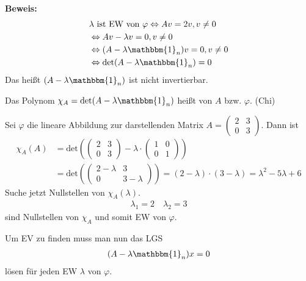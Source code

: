 \textbf{Beweis:}
\begin{align*}
	&\lambda\text{ ist EW von }\varphi \Leftrightarrow Av = 2v, v \neq 0 \\
	&\Leftrightarrow Av - \lambda v = 0, v \neq 0 \\
	&\Leftrightarrow (A - \lambda \mathbbm{1}_n)v = 0, v \neq 0 \\
	&\Leftrightarrow \text{det}(A - \lambda \mathbbm{1}_n) = 0
\end{align*}
Das heißt $(A - \lambda \mathbbm{1}_n)$ ist nicht invertierbar.

Das Polynom $\chi_A = \text{det}(A - \lambda \mathbbm{1}_n)$ heißt  von $A$ bzw. $\varphi$. (Chi)

Sei $\varphi$ die lineare Abbildung zur darstellenden Matrix $A = \begin{pmatrix}2 & 3 \\ 0 & 3\end{pmatrix}$. Dann ist
\begin{align*}
	\chi_A(A) &= \text{det}\left(\begin{pmatrix}2 & 3 \\ 0 & 3\end{pmatrix} - \lambda\cdot\begin{pmatrix}1 & 0 \\ 0 & 1\end{pmatrix}\right) \\
	&= \text{det}\left(\begin{pmatrix}2-\lambda & 3 \\ 0 & 3-\lambda\end{pmatrix}\right) = (2-\lambda)\cdot(3-\lambda) = \lambda^2 - 5\lambda + 6
\end{align*}
Suche jetzt Nullstellen von $\chi_A(\lambda)$.
\begin{align*}
	\lambda_1 = 2\quad\lambda_2 = 3
\end{align*}
sind Nullstellen von $\chi_A$ und somit EW von $\varphi$.

Um EV zu finden muss man nun das LGS
\begin{align*}
	(A - \lambda\mathbbm{1}_n)x = 0
\end{align*}
lösen für jeden EW $\lambda$ von $\varphi$.

